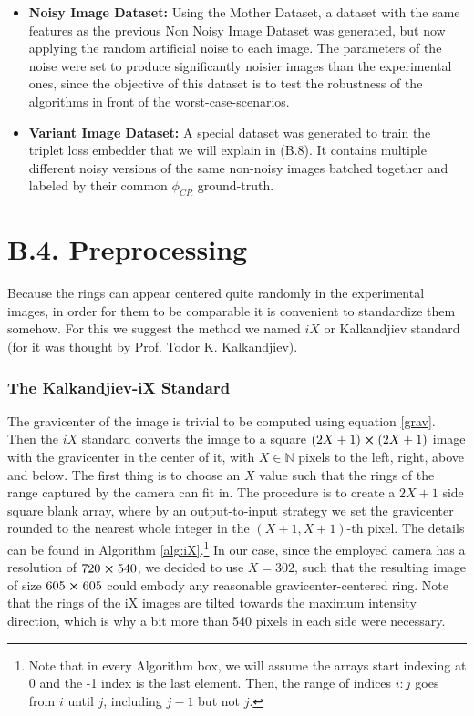 \documentclass[11pt, a4paper, twoside]{article} %
\newcommand{\N}{\mathbb{N}}
\begin{document}
\begin{itemize}
\item {\bf Noisy Image Dataset:} Using the Mother Dataset, a dataset with the same features as the previous Non Noisy Image Dataset was generated, but now applying the random artificial noise to each image. The parameters of the noise were set to produce significantly noisier images than the experimental ones, since the objective of this dataset is to test the robustness of the algorithms in front of the worst-case-scenarios.

\item {\bf Variant Image Dataset:} A special dataset was generated to train the triplet loss embedder that we will explain in (B.8). It contains multiple different noisy versions of the same non-noisy images batched together and labeled by their common $\phi_{CR}$ ground-truth.
\end{itemize}
\newpage
\section*{B.4. Preprocessing }\vspace{-0.1cm}
Because the rings can appear centered quite randomly in the experimental images, in order for them to be comparable it is convenient to standardize them somehow. For this we suggest the method we named $iX$ or Kalkandjiev standard (for it was thought by Prof. Todor K. Kalkandjiev).\vspace{-0.35cm}
\subsubsection*{The Kalkandjiev-iX Standard\vspace{-0.15cm}}
The gravicenter of the image is trivial to be computed using equation \eqref{grav}. Then the $iX$ standard converts the image to a square $(2X+1)\cross(2X+1)$ image with the gravicenter in the center of it, with $X\in\N$ pixels to the left, right, above and below. The first thing is to choose an $X$ value such that the rings of the range captured by the camera can fit in. The procedure is to create a $2X+1$ side square blank array, where by an output-to-input strategy we set the gravicenter rounded to the nearest whole integer in the $(X+1,X+1)$-th pixel. The details can be found in Algorithm \ref{alg:iX}.\footnote{Note that in every Algorithm box, we will assume the arrays start indexing at 0 and the -1 index is the last element. Then, the range of indices $i:j$ goes from $i$ until $j$, including $j-1$ but not $j$.} In our case, since the employed camera has a resolution of $720\cross 540$, we decided to use $X=302$, such that the resulting image of size $605\cross 605$ could embody any reasonable gravicenter-centered ring. Note that the rings of the iX images are tilted towards the maximum intensity direction, which is why a bit more than 540 pixels in each side were necessary.
\end{document}
